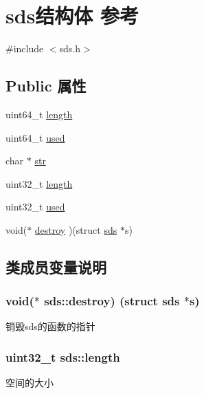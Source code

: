 \hypertarget{structsds}{}\section{sds结构体 参考}
\label{structsds}


{\ttfamily \#include $<$sds.\+h$>$}

\subsection*{Public 属性}
\begin{DoxyCompactItemize}
\item 
uint64\+\_\+t \hyperlink{structsds_adb90ca6e399d580a55ab9b5471386970}{length}
\item 
uint64\+\_\+t \hyperlink{structsds_af40aa3f62e6436d417ce199d6288664e}{used}
\item 
char $\ast$ \hyperlink{structsds_a3c48d440195e1e20c013334cd8dc3884}{str}
\item 
uint32\+\_\+t \hyperlink{structsds_a333f14feb33f9719162f37377629716a}{length}
\item 
uint32\+\_\+t \hyperlink{structsds_a5d733da962855ed70322d900c51eb65f}{used}
\item 
void($\ast$ \hyperlink{structsds_a9fc5eebd9a64a11f404c6a60fc08e403}{destroy} )(struct \hyperlink{structsds}{sds} $\ast$s)
\end{DoxyCompactItemize}


\subsection{类成员变量说明}
\subsubsection[{\texorpdfstring{destroy}{destroy}}]{\setlength{\rightskip}{0pt plus 5cm}void($\ast$ sds\+::destroy) (struct {\bf sds} $\ast$s)}\hypertarget{structsds_a9fc5eebd9a64a11f404c6a60fc08e403}{}\label{structsds_a9fc5eebd9a64a11f404c6a60fc08e403}
销毁sds的函数的指针 
\subsubsection[{\texorpdfstring{length}{length}}]{\setlength{\rightskip}{0pt plus 5cm}uint32\+\_\+t sds\+::length}\hypertarget{structsds_a333f14feb33f9719162f37377629716a}{}\label{structsds_a333f14feb33f9719162f37377629716a}
空间的大小 
